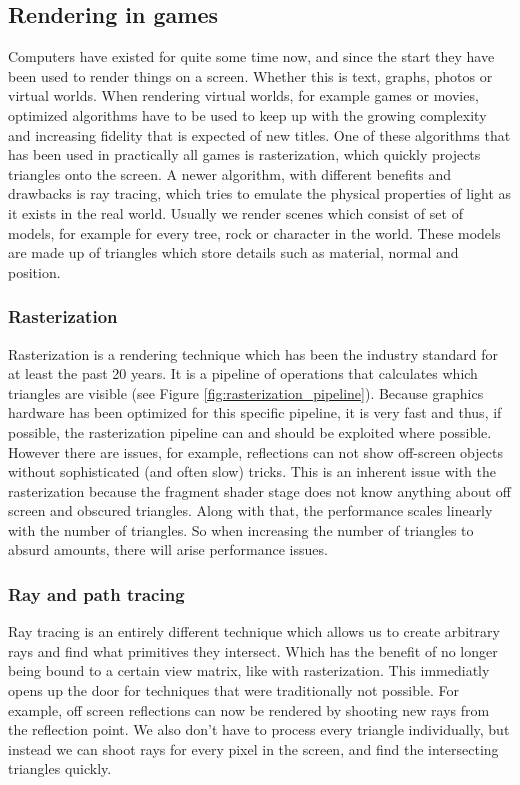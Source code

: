 \subsection{Rendering in games} \label{introduction:rendering}
Computers have existed for quite some time now, and since the start they have been used to render things on a screen. Whether this is text, graphs, photos or virtual worlds. When rendering virtual worlds, for example games or movies, optimized algorithms have to be used to keep up with the growing complexity and increasing fidelity that is expected of new titles. One of these algorithms that has been used in practically all games is rasterization, which quickly projects triangles onto the screen. A newer algorithm, with different benefits and drawbacks is ray tracing, which tries to emulate the physical properties of light as it exists in the real world. Usually we render scenes which consist of set of models, for example for every tree, rock or character in the world. These models are made up of triangles which store details such as material, normal and position.

\subsubsection{Rasterization} \label{introduction:rendering:rasterization}
Rasterization is a rendering technique which has been the industry standard for at least the past 20 years. It is a pipeline of operations that calculates which triangles are visible (see Figure \ref{fig:rasterization_pipeline}). Because graphics hardware has been optimized for this specific pipeline, it is very fast and thus, if possible, the rasterization pipeline can and should be exploited where possible. However there are issues, for example, reflections can not show off-screen objects without sophisticated (and often slow) tricks. This is an inherent issue with the rasterization because the fragment shader stage does not know anything about off screen and obscured triangles. Along with that, the performance scales linearly with the number of triangles. So when increasing the number of triangles to absurd amounts, there will arise performance issues.

\subsubsection{Ray and path tracing} \label{introduction:rendering:ray_tracing}
Ray tracing is an entirely different technique which allows us to create arbitrary rays and find what primitives they intersect. Which has the benefit of no longer being bound to a certain view matrix, like with rasterization. This immediatly opens up the door for techniques that were traditionally not possible. For example, off screen reflections can now be rendered by shooting new rays from the reflection point. We also don't have to process every triangle individually, but instead we can shoot rays for every pixel in the screen, and find the intersecting triangles quickly.

